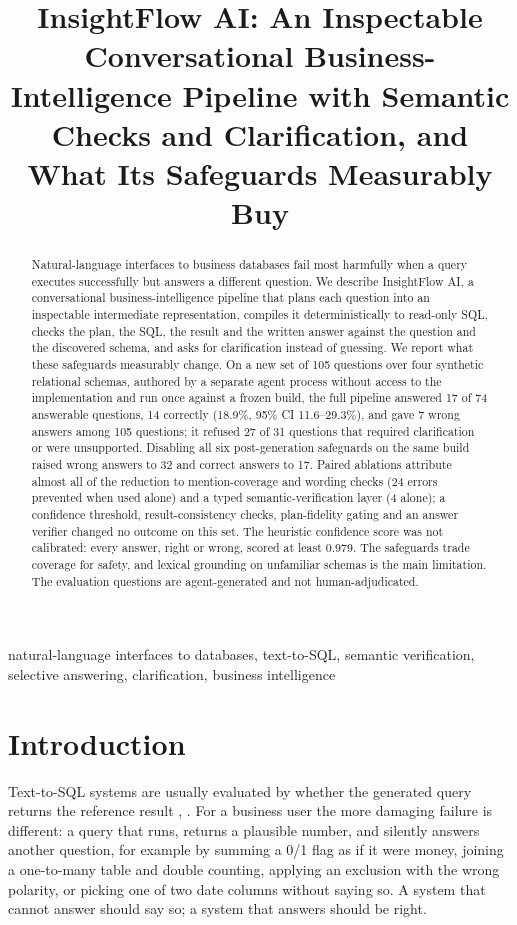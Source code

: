 \documentclass[conference]{IEEEtran}
\begin{document}
\title{InsightFlow AI: An Inspectable Conversational Business-Intelligence Pipeline with Semantic Checks and Clarification, and What Its Safeguards Measurably Buy}
\author{}
\maketitle
\begin{abstract}Natural-language interfaces to business databases fail most harmfully when a query executes successfully but answers a different question. We describe InsightFlow AI, a conversational business-intelligence pipeline that plans each question into an inspectable intermediate representation, compiles it deterministically to read-only SQL, checks the plan, the SQL, the result and the written answer against the question and the discovered schema, and asks for clarification instead of guessing. We report what these safeguards measurably change. On a new set of 105 questions over four synthetic relational schemas, authored by a separate agent process without access to the implementation and run once against a frozen build, the full pipeline answered 17 of 74 answerable questions, 14 correctly (18.9\%, 95\% CI 11.6--29.3\%), and gave 7 wrong answers among 105 questions; it refused 27 of 31 questions that required clarification or were unsupported. Disabling all six post-generation safeguards on the same build raised wrong answers to 32 and correct answers to 17. Paired ablations attribute almost all of the reduction to mention-coverage and wording checks (24 errors prevented when used alone) and a typed semantic-verification layer (4 alone); a confidence threshold, result-consistency checks, plan-fidelity gating and an answer verifier changed no outcome on this set. The heuristic confidence score was not calibrated: every answer, right or wrong, scored at least 0.979. The safeguards trade coverage for safety, and lexical grounding on unfamiliar schemas is the main limitation. The evaluation questions are agent-generated and not human-adjudicated.\end{abstract}
\begin{IEEEkeywords}natural-language interfaces to databases, text-to-SQL, semantic verification, selective answering, clarification, business intelligence\end{IEEEkeywords}
\section{Introduction}
Text-to-SQL systems are usually evaluated by whether the generated query returns the reference result \cite{r1}, \cite{r2}. For a business user the more damaging failure is different: a query that runs, returns a plausible number, and silently answers another question, for example by summing a 0/1 flag as if it were money, joining a one-to-many table and double counting, applying an exclusion with the wrong polarity, or picking one of two date columns without saying so. A system that cannot answer should say so; a system that answers should be right.
\end{document}
